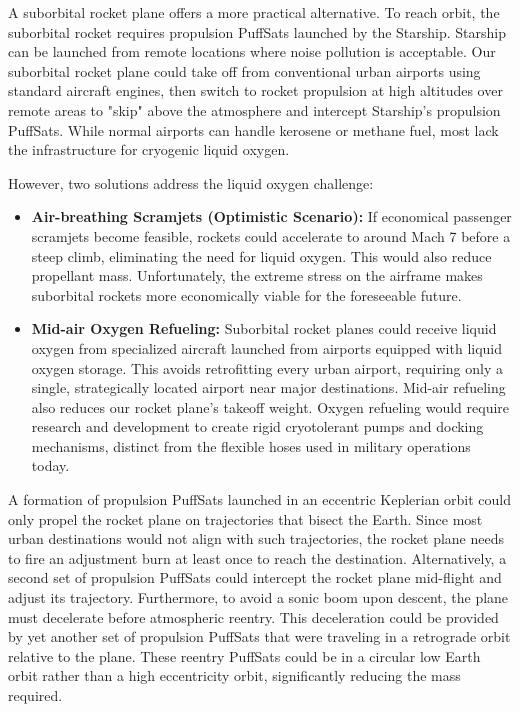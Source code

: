 \documentclass{article}
\begin{document}
{\begin{itemize}
\end{itemize}



A suborbital rocket plane offers a more practical alternative. To reach orbit, the suborbital rocket requires propulsion PuffSats launched by the Starship.   Starship can be launched from remote locations where noise pollution is acceptable.  Our suborbital rocket plane could take off from conventional urban airports using standard aircraft engines, then switch to rocket propulsion at high altitudes over remote areas to "skip" above the atmosphere and intercept Starship's propulsion PuffSats.   While normal airports can handle kerosene or methane fuel, most lack the infrastructure for cryogenic liquid oxygen.

However, two solutions address the liquid oxygen challenge:
\begin{itemize}
\item \textbf{Air-breathing Scramjets (Optimistic Scenario):} If economical passenger scramjets become feasible, rockets could accelerate to around Mach 7 before a steep climb, eliminating the need for liquid oxygen. This would also reduce propellant mass. Unfortunately, the extreme stress on the airframe makes suborbital rockets more economically viable for the foreseeable future.
\item \textbf{Mid-air Oxygen Refueling:} Suborbital rocket planes could receive liquid oxygen from specialized aircraft launched from airports equipped with liquid oxygen storage. This avoids retrofitting every urban airport, requiring only a single, strategically located airport near major destinations.   Mid-air refueling also reduces our rocket plane's takeoff weight.  Oxygen refueling would require research and development to create rigid cryotolerant pumps and docking mechanisms, distinct from the flexible hoses used in military operations today.
\end{itemize}

A formation of propulsion PuffSats launched in an eccentric Keplerian orbit could only propel the  rocket plane on trajectories that bisect the Earth. Since most urban destinations would not align with such trajectories, the rocket plane needs to fire an adjustment burn at least once to reach the destination. Alternatively, a second set of propulsion PuffSats could intercept the rocket plane mid-flight and adjust its trajectory. Furthermore, to avoid a sonic boom upon descent, the plane must decelerate before atmospheric reentry. This deceleration could be provided by yet another set of propulsion PuffSats that were traveling in a retrograde orbit relative to the plane. These reentry PuffSats could be in a circular low Earth orbit rather than a high eccentricity orbit, significantly reducing the mass required.

}
\end{document}
